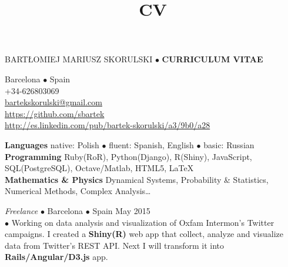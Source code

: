 \documentclass[a4paper, twoside]{scrreprt}
\title{CV}
\author{}
\date{}
\begin{document}
\noindent BARTŁOMIEJ MARIUSZ SKORULSKI $\bullet$ \textbf{CURRICULUM VITAE}
\vspace{-0.3cm}

\noindent\makebox[\linewidth]{\rule{\textwidth}{0.4pt}}

\vspace{0.2cm}

{\small
\noindent\llap{\FA \faHome\ \ } Barcelona $\bullet$ Spain\\
\noindent\llap{\FA \faMobilePhone\ \ \ }+34-626803069\\
\noindent\llap{\FA \faEnvelope\ \ } \href{mailto:bartekskorulski@gmail.com}{bartekskorulski@gmail.com}\\
\noindent\llap{\FA \faGithub\ \ }
\href{https://github.com/sbartek}{https://github.com/sbartek}\\
\noindent\llap{\FA \faLinkedin\ \ }
\href{http://es.linkedin.com/pub/bartek-skorulski/a3/9b0/a28}{http://es.linkedin.com/pub/bartek-skorulski/a3/9b0/a28}

\noindent\makebox[\linewidth]{\rule{\textwidth}{0.4pt}}

\vspace{0.2cm}

\noindent\llap{\FA \faComments\ \ }\textbf{Languages} native: Polish $\bullet$ fluent: Spanish, English  $\bullet$ basic: Russian \\
\noindent\llap{\FA \faKeyboard\ \ }\textbf{Programming} Ruby(RoR),  Python(Django),  R(Shiny), JavaScript, SQL(PostgreSQL), Octave/Matlab, HTML5, \LaTeX\\
\noindent\llap{\FA \faSuperscript\ \ }\textbf{Mathematics \& Physics} Dynamical Systems, Probability \& Statistics, Numerical Methods, 
Complex Analysis\ldots

\noindent\makebox[\linewidth]{\rule{\textwidth}{0.4pt}}

\vspace{0.2cm}

\noindent{}\textit{Freelance} $\bullet$ 
Barcelona $\bullet$ Spain \hfill May 2015\\
 $\bullet$
{\small Working on data analysis and visualization of Oxfam Intermon's
  Twitter campaigns. I created a \textbf{Shiny(R)} web app that collect,
  analyze and visualize data from Twitter's REST API. Next I will
  transform it into \textbf{Rails/Angular/D3.js} app.}\\

}
\end{document}
